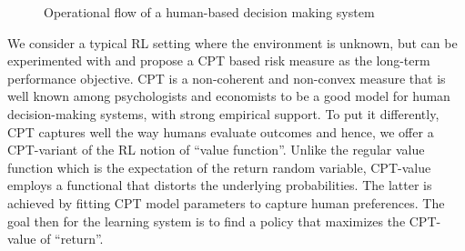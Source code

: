 \documentclass[11pt,letterpaper,english]{article}
\begin{document}
\begin{figure}[h]
\centering
{}
\caption{Operational flow of a human-based decision making system}
\label{eq:flow}
\end{figure}

We consider a typical RL setting where the environment is unknown, but can be experimented with and propose a CPT based risk measure as the long-term performance objective. 
CPT is a non-coherent and non-convex measure that is well known among psychologists and economists to be a good model for human decision-making systems, with strong empirical support.
To put it differently, CPT captures well the way humans evaluate outcomes and hence, we offer a CPT-variant of the RL notion of ``value function''. Unlike the regular value function which is the expectation of the return random variable, CPT-value employs a functional that distorts the underlying probabilities. The latter is achieved by fitting CPT model parameters to capture human preferences. The goal then for the learning system is to find a policy that maximizes the CPT-value of ``return''. 
\end{document}
